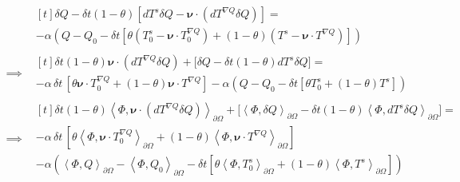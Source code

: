 \documentclass[reqno]{article}
\begin{document}
\begin{equation} \label{eq:surface-weak-form}
\begin{split}
&\begin{multlined}[t]
    \delta Q - \delta t \left(1 - \theta\right) \left[ dT^s \delta Q - \boldsymbol\nu \cdot \left( dT^{\nabla Q} \delta Q \right) \right]
    = \\
    - \alpha \left(
        Q - Q_0 - \delta t \left[
            \theta \left( T_0^s - \boldsymbol\nu \cdot T_0^{\nabla Q} \right)
            + \left(1 - \theta\right) \left( T^s - \boldsymbol\nu \cdot T^{\nabla Q} \right)
        \right]
    \right) 
\end{multlined} \\
\implies
&\begin{multlined}[t]
    \delta t \left(1 - \theta\right) \boldsymbol\nu \cdot \left( dT^{\nabla Q} \delta Q \right)
    + \biggl[ \delta Q - \delta t \left(1 - \theta \right) dT^s \delta Q \biggr]
    = \\
    -\alpha \, \delta t \, \left[ 
        \theta \boldsymbol\nu \cdot T_0^{\nabla Q} + \left(1 - \theta\right) \boldsymbol\nu \cdot T^{\nabla Q} 
    \right]
    -
    \alpha \left(Q - Q_0 - \delta t \left[ \theta T_0^s + \left(1 - \theta\right) T^s \right] \right)
\end{multlined} \\
\implies
&\begin{multlined}[t]
    \delta t \left(1 - \theta\right) \left< \Phi, \boldsymbol\nu \cdot \left( dT^{\nabla Q} \delta Q \right) \right>_{\partial \Omega}
    + \biggl[ \left< \Phi, \delta Q \right>_{\partial \Omega} - \delta t \left(1 - \theta \right) \left< \Phi, dT^s \delta Q \right>_{\partial \Omega} \biggr]
    = \\
    -\alpha \, \delta t \, \left[ 
        \theta \left<\Phi, \boldsymbol\nu \cdot T_0^{\nabla Q}\right>_{\partial \Omega} + \left(1 - \theta\right) \left<\Phi, \boldsymbol\nu \cdot T^{\nabla Q} \right>_{\partial \Omega}
    \right] \\
    -
    \alpha \left(
        \left<\Phi, Q\right>_{\partial \Omega} 
            - \left< \Phi, Q_0 \right>_{\partial \Omega} 
            - \delta t \left[ 
                \theta \left<\Phi, T_0^s\right>_{\partial \Omega} 
                + \left(1 - \theta\right) \left< \Phi, T^s \right>_{\partial \Omega} 
            \right] 
    \right)
\end{multlined}
\end{split}
\end{equation}
\end{document}

